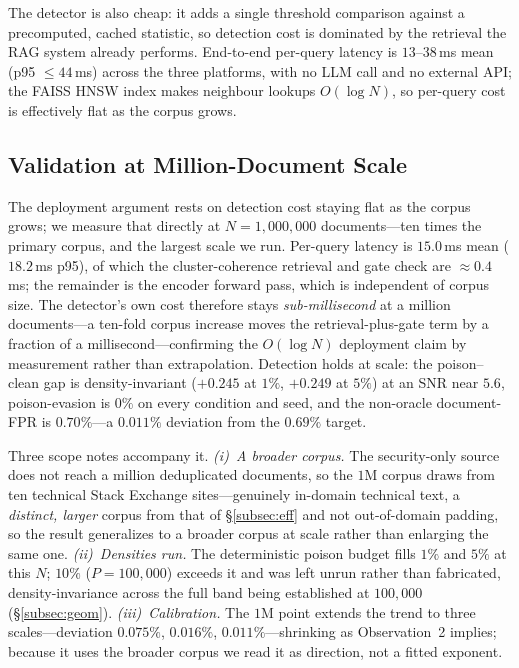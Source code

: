 \documentclass[conference]{IEEEtran}
\begin{document}
The detector is also cheap: it adds a single threshold comparison against a precomputed, cached
statistic, so detection cost is dominated by the retrieval the RAG system already performs.
End-to-end per-query latency is $13$--$38$\,ms mean (p95 $\le 44$\,ms) across the three platforms, with no LLM call and no external API; the FAISS HNSW index makes
neighbour lookups $O(\log N)$, so per-query cost is effectively flat as the corpus grows.

\subsection{Validation at Million-Document Scale}
\label{subsec:scale}
The deployment argument rests on detection cost staying flat as the corpus grows; we
measure that directly at $N=1{,}000{,}000$ documents---ten times the primary corpus,
and the largest scale we run. Per-query latency is $15.0$\,ms mean ($18.2$\,ms p95),
of which the cluster-coherence retrieval and gate check are $\approx\!0.4$\,ms; the
remainder is the encoder forward pass, which is independent of corpus size. The
detector's own cost therefore stays \emph{sub-millisecond} at a million
documents---a ten-fold corpus increase moves the retrieval-plus-gate term by a
fraction of a millisecond---confirming the $O(\log N)$ deployment claim by measurement
rather than extrapolation. Detection holds at scale: the
poison--clean gap is density-invariant ($+0.245$ at $1\%$, $+0.249$ at $5\%$) at an
SNR near $5.6$, poison-evasion is $0\%$ on every condition and seed, and the
non-oracle document-FPR is $0.70\%$---a $0.011\%$ deviation from the $0.69\%$
target.

Three scope notes accompany it. \emph{(i)~A broader corpus.} The security-only source does not
reach a million deduplicated documents, so the $1$M corpus draws from ten technical Stack
Exchange sites---genuinely in-domain technical text, a \emph{distinct, larger} corpus from that
of \S\ref{subsec:eff} and not out-of-domain padding, so the result generalizes to a broader
corpus at scale rather than enlarging the same one. \emph{(ii)~Densities run.} The deterministic
poison budget fills $1\%$ and $5\%$ at this $N$; $10\%$ ($P=100{,}000$) exceeds it and was left
unrun rather than fabricated, density-invariance across the full band being established at
$100{,}000$ (\S\ref{subsec:geom}). \emph{(iii)~Calibration.} The $1$M point extends the trend to
three scales---deviation $0.075\%$, $0.016\%$, $0.011\%$---shrinking as Observation~2 implies;
because it uses the broader corpus we read it as direction, not a fitted exponent.
\end{document}
